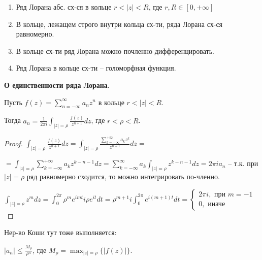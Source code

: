 \begin{properties}
    \begin{enumerate}
        \item Ряд Лорана абс. сх-ся в кольце $r < |z| < R$, где $r, R \in [0, +\infty]$
        \item В кольце, лежащем строго внутри кольца сх-ти, ряда Лорана сх-ся равномерно.
        \item В кольце сх-ти ряд Лорана можно почленно дифференцировать.
        \item Ряд Лорана в кольце сх-ти -- голоморфная функция.
    \end{enumerate}
\end{properties}

\begin{theorem}
    \textbf{О единственности ряда Лорана}.

    Пусть $f(z) = \sum_{n=-\infty}^{\infty} a_n z^n$ в кольце $r < |z| < R$.

    Тогда $a_n = \frac{1}{2 \pi i} \int_{|z| = \rho} {\frac{f(z)}{z^{n+1}} dz}$, где $r < \rho < R$.
\end{theorem}

\begin{proof}
    $\int_{|z| = \rho} { \frac{f(z)}{z^{n+1}} dz } = \int_{|z| = \rho} { \frac{\sum_{k = -\infty}^{+\infty} a_k z^k}{z^{n+1}} dz } =$

    $= \int_{|z| = \rho} { \sum_{k=-\infty}^{+\infty} a_k z^{k - n - 1} dz } = \sum_{k = -\infty}^{\infty} a_k \int_{|z| = \rho} { z^{k-n-1} dz } = 2\pi i a_n$ -- т.к. при $|z| = \rho$ ряд равномерно сходится, то можно интегрировать по-членно.

    $\int_{|z| = \rho} { z^m dz } = \int_{0}^{2\pi} { \rho^m e^{i m t} i \rho e^{i t} dt } = \rho^{m+1} i \int_{0}^{2\pi} { e^{i (m+1) t} dt } = \begin{cases}
        2 \pi i, \text{ при } m = -1 \\
        0, \text{ иначе}
    \end{cases}$
\end{proof}


\begin{remark}
    Нер-во Коши тут тоже выполняется:

    $|a_n| \leq \frac{M_{\rho}}{\rho^n}$, где $M_{\rho} = \max_{|z| = \rho}\{ |f(z)| \}$.
\end{remark}

